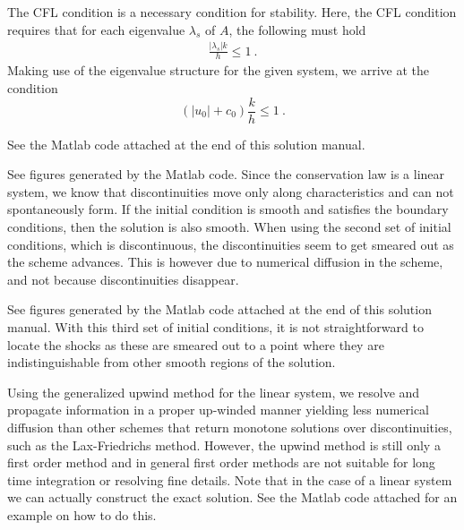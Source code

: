 \documentclass{article}
\begin{document}
\begin{exerciseList}
\item
The CFL condition is a necessary condition for stability.
Here, the CFL condition requires that for each eigenvalue $\lambda_{s}$ of $A$, the following must hold
\begin{gather}
	\frac{|\lambda_{s}|k}{h} \leq1\ .
\end{gather}
Making use of the eigenvalue structure for the given system, we arrive at the condition
\begin{equation}
	\left(|u_{0}|+c_{0}\right)\frac{k}{h}\leq1\ .
\end{equation}



\item
See the Matlab code attached at the end of this solution manual.


\item
See figures generated by the Matlab code.
Since the conservation law is a linear system, we know that discontinuities move only along characteristics and can not spontaneously form.
If the initial condition is smooth and satisfies the boundary conditions, then the solution is also smooth.
When using the second set of initial conditions, which is  discontinuous, the discontinuities
seem to get smeared out as the scheme advances.
This is however due to numerical diffusion in the scheme, and not because discontinuities disappear.


\item
See figures generated by the Matlab code attached at the end of this solution manual.
With this third set of initial conditions, it is not straightforward to locate the shocks as these are smeared out to a point where they are indistinguishable from other smooth regions of the solution.

Using the generalized upwind method for the linear system, we resolve and propagate information in a proper up-winded manner yielding less numerical diffusion than other schemes that return monotone solutions over discontinuities, such as the Lax-Friedrichs method.
However, the upwind method is still only a first order method and in general first order methods are not suitable for long time integration or resolving fine details.
Note that in the case of a linear system we can actually construct the exact solution.
See the Matlab code attached for an example on how to do this. 


\end{exerciseList}



\newpage



\end{document}

